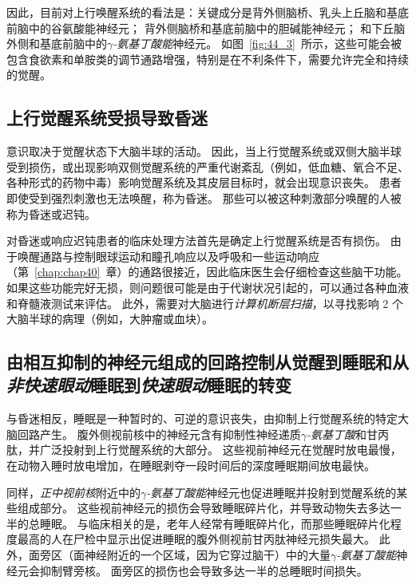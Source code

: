 因此，目前对上行唤醒系统的看法是：关键成分是背外侧脑桥、乳头上丘脑和基底前脑中的谷氨酸能神经元；
背外侧脑桥和基底前脑中的胆碱能神经元；
和下丘脑外侧和基底前脑中的\textit{$\gamma$-氨基丁酸能}神经元。
如图~\ref{fig:44_3}~所示，这些可能会被包含食欲素和单胺类的调节通路增强，特别是在不利条件下，需要允许完全和持续的觉醒。



\subsection{上行觉醒系统受损导致昏迷}

意识取决于觉醒状态下大脑半球的活动。
因此，当上行觉醒系统或双侧大脑半球受到损伤，或出现影响双侧觉醒系统的严重代谢紊乱（例如，低血糖、氧合不足、各种形式的药物中毒）影响觉醒系统及其皮层目标时，就会出现意识丧失。
患者即使受到强烈刺激也无法唤醒，称为昏迷。
那些可以被这种刺激部分唤醒的人被称为昏迷或迟钝。


对昏迷或响应迟钝患者的临床处理方法首先是确定上行觉醒系统是否有损伤。
由于唤醒通路与控制眼球运动和瞳孔响应以及呼吸和一些运动响应（第~\ref{chap:chap40}~章）的通路很接近，因此临床医生会仔细检查这些脑干功能。
如果这些功能完好无损，则问题很可能是由于代谢状况引起的，可以通过各种血液和脊髓液测试来评估。
此外，需要对大脑进行\textit{计算机断层扫描}，以寻找影响 2 个大脑半球的病理（例如，大肿瘤或血块）。



\subsection{由相互抑制的神经元组成的回路控制从觉醒到睡眠和从\textit{非快速眼动}睡眠到\textit{快速眼动}睡眠的转变}

与昏迷相反，睡眠是一种暂时的、可逆的意识丧失，由抑制上行觉醒系统的特定大脑回路产生。
腹外侧视前核中的神经元含有抑制性神经递质\textit{$\gamma$-氨基丁酸}和甘丙肽，并广泛投射到上行觉醒系统的大部分。
这些视前神经元在觉醒时放电最慢，在动物入睡时放电增加，在睡眠剥夺一段时间后的深度睡眠期间放电最快。


同样，\textit{正中视前核}附近中的\textit{$\gamma$-氨基丁酸能}神经元也促进睡眠并投射到觉醒系统的某些组成部分。
这些视前神经元的损伤会导致睡眠碎片化，并导致动物失去多达一半的总睡眠。
与临床相关的是，老年人经常有睡眠碎片化，而那些睡眠碎片化程度最高的人在尸检中显示出促进睡眠的腹外侧视前甘丙肽神经元损失最大。
此外，面旁区（面神经附近的一个区域，因为它穿过脑干）中的大量\textit{$\gamma$-氨基丁酸能}神经元会抑制臂旁核。
面旁区的损伤也会导致多达一半的总睡眠时间损失。


